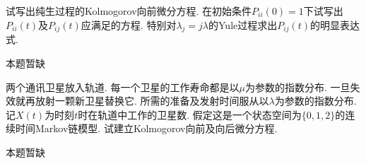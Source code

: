 \begin{problem}{3.30}
试写出纯生过程的Kolmogorov向前微分方程. 在初始条件$P_{ii}(0) = 1$下试写出$P_{ii}(t)$及$P_{ij}(t)$应满足的方程. 特别对$\lambda_j = j\lambda$的Yule过程求出$P_{ij}(t)$的明显表达式.
\end{problem}
\begin{solution}
	本题暂缺
\end{solution}

\begin{problem}{3.31}
两个通讯卫星放入轨道. 每一个卫星的工作寿命都是以$\mu$为参数的指数分布. 一旦失效就再放射一颗新卫星替换它. 所需的准备及发射时间服从以$\lambda$为参数的指数分布. 记$X(t)$为时刻$t$时在轨道中工作的卫星数. 假定这是一个状态空间为$\{0,1,2\}$的连续时间Markov链模型. 试建立Kolmogorov向前及向后微分方程.
\end{problem}
\begin{solution}
	本题暂缺
\end{solution}

